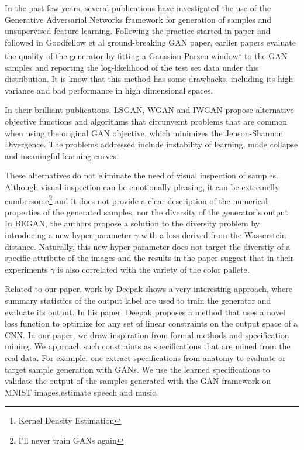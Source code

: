 In the past few years, several publications have investigated the use of the
Generative Adversarial Networks framework for generation of samples and
unsupervised feature learning. Following the practice started in paper and
followed in Goodfellow et al ground-breaking GAN paper, earlier papers evaluate
the quality of the generator by fitting a Gaussian Parzen window\footnote{Kernel
Density Estimation} to the GAN samples and reporting the log-likelihood of the
test set data under this distribution. It is know that this method has some drawbacks, 
including its high variance and bad performance in high dimensional spaces. 

In their brilliant publications, LSGAN, WGAN and IWGAN propose alternative
objective functions and algorithms that circunvemt problems that are common when using the
original GAN objective, which minimizes the Jenson-Shannon Divergence. The problems 
addressed include instability of learning, mode collapse and meaningful learning curves. 

These alternatives do not eliminate the need of visual inspection of samples. 
Although visual inspection can be emotionally pleasing, it can be extremelly cumbersome\footnote{I'll never train GANs again} and it does not provide a clear 
description of the numerical properties of the generated samples, nor the
diversity of the generator's output. In BEGAN, the authors propose a solution to
the diversity problem by introducing a new hyper-parameter $\gamma$ with a loss
derived from the Wasserstein distance. Naturally, this new hyper-parameter does
not target the diverstiy of a specific attribute of the images and the results in the
paper suggest that in their experiments $\gamma$ is also correlated with the variety
of the color pallete.  

Related to our paper, work by Deepak shows a very interesting approach, where summary 
statistics of the output label are used to train the generator and evaluate its output. 
In his paper, Deepak proposes a method that uses a novel loss function to
optimize for any set of linear constraints on the output space of a CNN.
In our paper, we draw inspiration from formal methods and specification mining.
We approach such constraints as specifications that are mined from the
real data. For example, one extract specifications from anatomy to
evaluate or target sample generation with GANs. We use the learned specifications 
to validate the output of the samples generated with the GAN framework on MNIST
images,estimate  speech and music.
